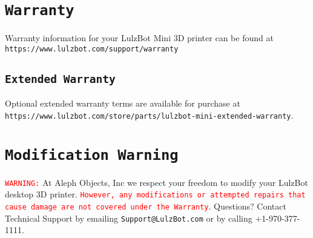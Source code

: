 %
%
%
%
%

\section{\texttt{Warranty}}
Warranty information for your LulzBot\textsuperscript{\miniscule{\textregistered}} Mini 3D printer can be found at \texttt{https://www.lulzbot.com/support/warranty}

\subsection{\texttt{Extended Warranty}}
Optional extended warranty terms are available for purchase at \texttt{https://www.lulzbot.com/store/parts/lulzbot-mini-extended-warranty}.

\section{\texttt{Modification Warning}}
\textcolor{red}{\texttt{WARNING:}} At Aleph Objects, Inc\textsuperscript{\miniscule{\textregistered}} we respect your freedom to modify your LulzBot desktop 3D printer. \textcolor{red}{\texttt{However, any modifications or attempted repairs that cause damage are not covered under the Warranty}}. Questions? Contact Technical Support by emailing \texttt{Support@LulzBot.com} or by calling +1-970-377-1111.
